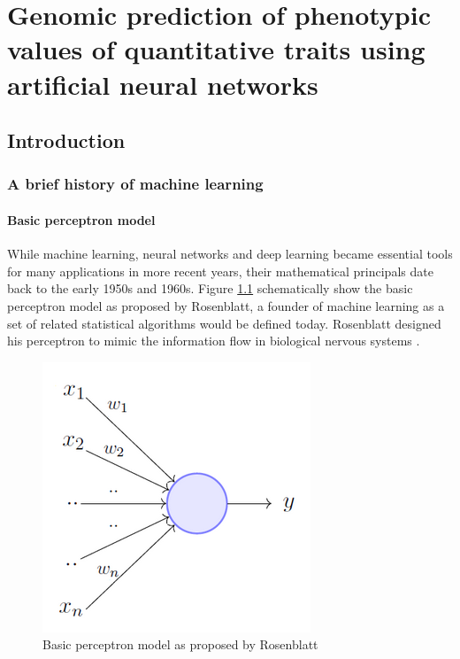 \chapter{Genomic prediction of phenotypic values of quantitative traits using artificial neural networks}

\label{Chapter3} %


\section{Introduction}
\subsection{A brief history of machine learning} \label{introml}
\subsubsection{Basic perceptron model}

While machine learning, neural networks and deep learning became essential tools for many applications in more
recent years, their mathematical principals date back to the early 1950s and 1960s. Figure
\ref{fig:perceptron} schematically show the basic perceptron model as proposed by Rosenblatt, a founder of
machine learning as a set of related statistical algorithms would be defined today. Rosenblatt designed his
perceptron to mimic the information flow in biological nervous systems \cite{rosenblatt1961}.

\begin{figure}[th]
 \centering \includegraphics[height=.25\textheight, width=.5\textwidth]{Figures/perceptron.png} \decoRule
\caption[Basic perceptron model]{Basic perceptron model as proposed by Rosenblatt \cite{rosenblatt1961}}
\label{fig:perceptron}
\end{figure}


